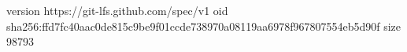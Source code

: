 version https://git-lfs.github.com/spec/v1
oid sha256:ffd7fc40aac0de815c9be9f01ccde738970a08119aa6978f967807554eb5d90f
size 98793
